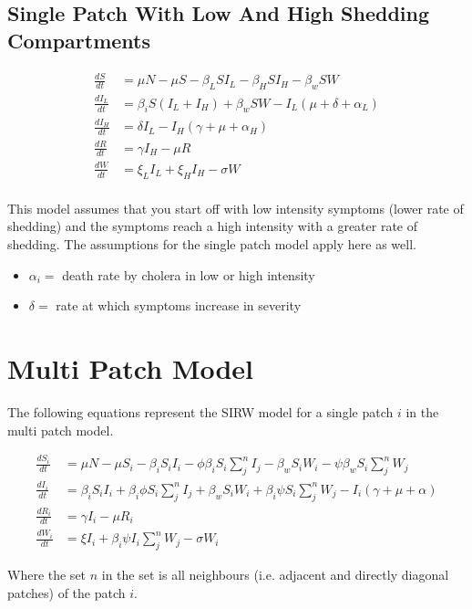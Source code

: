 \documentclass[12pt]{article}\usepackage[]{graphicx}\usepackage[]{color}
\begin{document}
\subsection{Single Patch With Low And High Shedding Compartments}

\begin{linenomath}
\begin{align*}
	\frac{dS}{dt}&= \mu N - \mu S - \beta_L S I_L - \beta_H S I_H - \beta_w S W  \\
	\frac{dI_L}{dt}&= \beta_i S( I_L + I_H) + \beta_w S W - I_L (\mu + \delta + \alpha_L) \\
	\frac{dI_H}{dt}&= \delta I_L - I_H (\gamma + \mu + \alpha_H) \\
	\frac{dR}{dt}&= \gamma I_H - \mu R \\
	\frac{dW}{dt}&= \xi_L I_L + \xi_H I_H  - \sigma W\\
	\end{align*}
\end{linenomath}

This model assumes that you start off with low intensity symptoms (lower rate of shedding) and the symptoms reach a high intensity with a greater rate of shedding. The assumptions for the single patch model apply here as well.
\begin{itemize}
	\item$\alpha_i=$ death rate by cholera in low or high intensity
	\item$\delta =$ rate at which symptoms increase in severity
\end{itemize}

\section{Multi Patch Model}

The following equations represent the SIRW model for a single patch $i$ in the multi patch model.
\begin{linenomath}
\begin{align*}
    \frac{dS_i}{dt}&= \mu N - \mu S_i - \beta_i S_i I_i - \phi \beta_i S_i \sum_j^n I_j - \beta_w S_i W_i - \psi \beta_w S_i \sum_j^n W_j\\
    \frac{dI_i}{dt}&= \beta_i S_i I_i + \beta_i \phi S_i \sum_j^n I_j + \beta_w S_i W_i + \beta_i \psi S_i \sum_j^n W_j - I_i (\gamma + \mu + \alpha) \\
    \frac{dR_i}{dt}&= \gamma I_i - \mu R_i \\
    \frac{dW_i}{dt}&= \xi I_i + \beta_i \psi I_i \sum_j^n W_j  - \sigma W_i
\end{align*}
\end{linenomath}
Where the set $n$ in the set is all neighbours (i.e. adjacent and directly diagonal patches) of the patch $i$.
\end{document}
